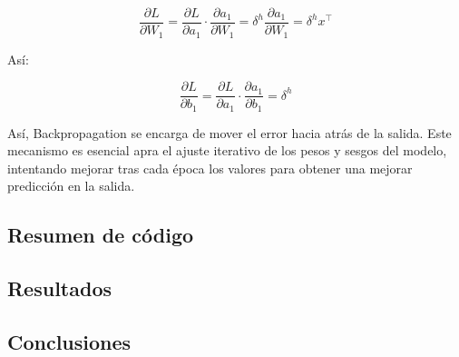 \[
    \frac{\partial L}{\partial W_1} = \frac{\partial L}{\partial a_1} \cdot \frac{\partial a_1}{\partial W_1} = \delta^h \frac{\partial a_1}{\partial W_1} = \delta^h x^\top
\]

Así:

\[
    \frac{\partial L}{\partial b_1} = \frac{\partial L}{\partial a_1} \cdot \frac{\partial a_1}{\partial b_1} = \delta^h
\]

Así, Backpropagation se encarga de mover el error hacia atrás de la salida. Este mecanismo es esencial apra el ajuste
iterativo de los pesos y sesgos del modelo, intentando mejorar tras cada época los valores para obtener una mejorar
predicción en la salida.  





\subsection{Resumen de código}

\subsection{Resultados}

\subsection{Conclusiones}

\clearpage